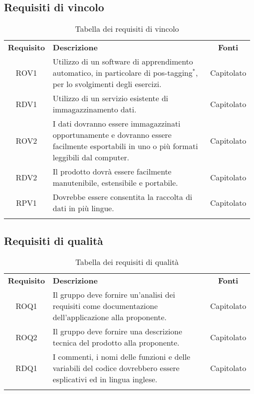 \subsection{Requisiti di vincolo}
\begin{longtable}{| c | p{10cm} | c |}
		\rowcolor{LightBlue}
		\color{white}\bfseries Requisito & \color{white}\bfseries Descrizione & \color{white}\bfseries Fonti\\[0.25cm]
		ROV1 & Utilizzo di un software di apprendimento automatico, in particolare di pos-tagging$^*$, per lo svolgimenti degli esercizi. & Capitolato \\
		RDV1 & Utilizzo di un servizio esistente di immagazzinamento dati. & Capitolato \\
		ROV2 & I dati dovranno essere immagazzinati opportunamente e dovranno essere facilmente esportabili in uno o più formati leggibili dal computer. & Capitolato \\
		RDV2 & Il prodotto dovrà essere facilmente manutenibile, estensibile e portabile. & Capitolato \\
		RPV1 & Dovrebbe essere consentita la raccolta di dati in più lingue. & Capitolato \\ \hline
		\caption{Tabella dei requisiti di vincolo}
\end{longtable}

\subsection{Requisiti di qualità}
\begin{longtable}{| c | p{10cm} | c |}
		\rowcolor{LightBlue}
		\color{white}\bfseries Requisito & \color{white}\bfseries Descrizione & \color{white}\bfseries Fonti\\[0.25cm]
		ROQ1 & Il gruppo deve fornire un'analisi dei requisiti come documentazione dell'applicazione alla proponente. & Capitolato \\
		ROQ2 & Il gruppo deve fornire una descrizione tecnica del prodotto alla proponente. & Capitolato \\ 
		RDQ1 & I commenti, i nomi delle funzioni e delle variabili del codice dovrebbero essere esplicativi ed in lingua inglese. & Capitolato \\ \hline
		\caption{Tabella dei requisiti di qualità}
\end{longtable}